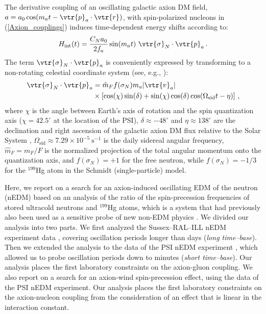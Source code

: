 The derivative coupling of an oscillating galactic axion DM field, $a = a_0 \cos(m_a t - \vtr{p}_a \cdot \vtr{r})$, with spin-polarized nucleons in (\ref{Axion_couplings}) induces time-dependent energy shifts according to:
\begin{equation}
\label{potential_axion-wind}
H_{\textrm{int}} (t) = \frac{C_N a_0}{2 f_a} \sin(m_a t) ~ \vtr{\sigma}_N \cdot \vtr{p}_a \, .
\end{equation}
The term $\vtr{\sigma}_N \cdot \vtr{p}_a$ is conveniently expressed by transforming to a non-rotating celestial coordinate system (see, e.g., \cite{Kostelecky1999}):
\begin{align}
\label{sigma-p_a_2}
\vtr{\sigma}_N \cdot \vtr{p}_a  &= \hat{m}_F f(\sigma_N) m_a |\vtr{v}_a|  \notag \\
& \times \left[\cos(\chi) \sin(\delta) + \sin(\chi) \cos(\delta) \cos(\Omega_{\textrm{sid}} t - \eta) \right] \, ,
\end{align}
where $\chi$ is the angle between Earth's axis of rotation and the spin quantization axis ($\chi = 42.5 ^\circ$ at the location of the PSI), $\delta \approx -48 ^\circ$ and $\eta \approx 138 ^\circ$ are the declination and right ascension of the galactic axion DM flux relative to the Solar System \cite{NASA2014web}, $\Omega_{\textrm{sid}} \approx 7.29 \times 10^{-5}~\textrm{s}^{-1}$ is the daily sidereal angular frequency, $\hat{m}_F = m_F / F$ is the normalized projection of the total angular momentum onto the quantization axis, and $f(\sigma_N) = +1$ for the free neutron, while $f(\sigma_N) = -1/3$ for the $^{199}$Hg atom in the Schmidt (single-particle) model.


Here, we report on a search for an axion-induced oscillating EDM of the neutron (nEDM) based on an analysis of the ratio of the spin-precession frequencies of stored ultracold neutrons and $^{199}$Hg atoms, which is a system that had previously also been used as a sensitive probe of new non-EDM physics \cite{Altarev2009,Altarev2010,Afach2015_NF}.
We divided our analysis into two parts.
We first analyzed the Sussex--RAL--ILL nEDM experiment data \cite{Baker2014}, covering oscillation periods longer than days (\emph{long time--base}).
Then we extended the analysis to the data of the PSI nEDM experiment \cite{Baker2011}, which allowed us to probe oscillation periods down to minutes (\emph{short time--base}).
Our analysis places the first laboratory constraints on the axion-gluon coupling.
We also report on a search for an axion-wind spin-precession effect, using the data of the PSI nEDM experiment. Our analysis places the first laboratory constraints on the axion-nucleon coupling from the consideration of an effect that is linear in the interaction constant.

